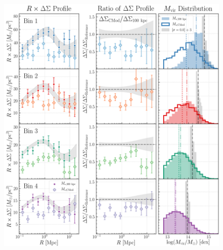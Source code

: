 \documentclass[a4paper,fleqn,usenatbib]{mnras}
\begin{document}
  \begin{figure}
      \centering 
      \includegraphics[width=\textwidth]{figure/topn_dsigma_m100_cmod_compare}
      \caption{
          }
      \label{fig:m100_cmod}
  \end{figure}
\end{document}
